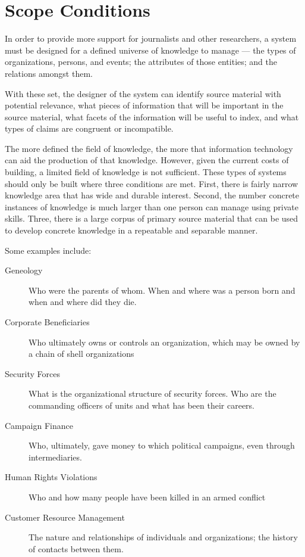 \documentclass[format=siggraph, review=true]{acmart}
\begin{document}
\section{Scope Conditions}
In order to provide more support for journalists and other
researchers, a system must be designed for a defined universe of
knowledge to manage --- the types of organizations, persons, and
events; the attributes of those entities; and the relations amongst
them.

With these set, the designer of the system can identify source
material with potential relevance, what pieces of information that
will be important in the source material, what facets of the
information will be useful to index, and what types of claims are
congruent or incompatible.


The more defined the field of knowledge, the more that information
technology can aid the production of that knowledge. However, given
the current costs of building, a limited field of knowledge is not
sufficient. These types of systems should only be
built where three conditions are met. First, there is fairly narrow
knowledge area that has wide and durable interest. Second, the number
concrete instances of knowledge is much larger than one person can
manage using private skills. Three, there is a large corpus of primary
source material that can be used to develop concrete knowledge in a
repeatable and separable manner. 

Some examples include:

\begin{description}
  \item [Geneology] Who were the parents of whom. When and where was a person
    born and when and where did they die.
  \item [Corporate Beneficiaries] Who ultimately owns or controls an
    organization, which may be owned by a chain of shell organizations
  \item [Security Forces] What is the organizational structure of
    security forces. Who are the commanding officers of units and
    what has been their careers.
  \item [Campaign Finance] Who, ultimately, gave money to which
    political campaigns, even through intermediaries.
  \item [Human Rights Violations] Who and how many people have been
    killed in an armed conflict
  \item [Customer Resource Management] The nature and relationships of individuals and organizations; the history of contacts between them. 
\end{description}
\end{document}
